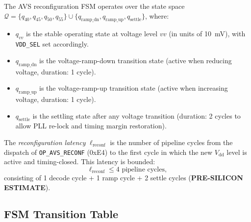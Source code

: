 \begin{definition}
\label{def:avs_fsm_states}
The AVS reconfiguration FSM operates over the state space
$\mathcal{Q} = \{q_{40}, q_{45}, q_{50}, q_{55}\} \cup
\{q_\mathrm{ramp\_dn}, q_\mathrm{ramp\_up}, q_\mathrm{settle}\}$,
where:
\begin{itemize}
  \item $q_{vv}$ is the stable operating state at voltage level $vv$
    (in units of 10~mV), with \texttt{VDD\_SEL} set accordingly.
  \item $q_\mathrm{ramp\_dn}$ is the voltage-ramp-down transition state
    (active when reducing voltage, duration: 1 cycle).
  \item $q_\mathrm{ramp\_up}$ is the voltage-ramp-up transition state
    (active when increasing voltage, duration: 1 cycle).
  \item $q_\mathrm{settle}$ is the settling state after any voltage
    transition (duration: 2 cycles to allow PLL re-lock and timing
    margin restoration).
\end{itemize}
\end{definition}

\begin{definition}
\label{def:reconfig_latency}
The \emph{reconfiguration latency} $\ell_\mathrm{reconf}$ is the
number of pipeline cycles from the dispatch of \texttt{OP\_AVS\_RECONF}
(0xE4) to the first cycle in which the new $V_\mathrm{dd}$ level is
active and timing-closed.  This latency is bounded:
\[
  \ell_\mathrm{reconf} \leq 4 \text{ pipeline cycles},
\]
consisting of 1 decode cycle + 1 ramp cycle + 2 settle cycles
(\textbf{PRE-SILICON ESTIMATE}).
\end{definition}

\subsection{FSM Transition Table}

